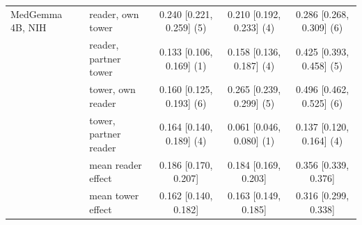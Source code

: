 \documentclass{article}
\begin{document}
\begin{table}[htbp]
\begin{tabular}{llccc}
\addlinespace
MedGemma 4B, NIH & reader, own tower & 0.240 [0.221, 0.259] (5) & 0.210 [0.192, 0.233] (4) & 0.286 [0.268, 0.309] (6) \\
 & reader, partner tower & 0.133 [0.106, 0.169] (1) & 0.158 [0.136, 0.187] (4) & 0.425 [0.393, 0.458] (5) \\
 & tower, own reader & 0.160 [0.125, 0.193] (6) & 0.265 [0.239, 0.299] (5) & 0.496 [0.462, 0.525] (6) \\
 & tower, partner reader & 0.164 [0.140, 0.189] (4) & 0.061 [0.046, 0.080] (1) & 0.137 [0.120, 0.164] (4) \\
 & \quad mean reader effect & 0.186 [0.170, 0.207] & 0.184 [0.169, 0.203] & 0.356 [0.339, 0.376] \\
 & \quad mean tower effect & 0.162 [0.140, 0.182] & 0.163 [0.149, 0.185] & 0.316 [0.299, 0.338] \\
\bottomrule
\end{tabular}
\end{table}
\end{document}
